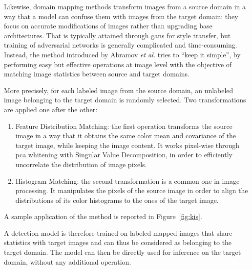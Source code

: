 \documentclass[%
    corpo=12pt,
    twoside,
    stile=classica,   
    tipotesi=magistrale,
    evenboxes,
    english,
	numerazioneromana,
]{toptesi}
\newcommand{\quotes}[1]{``#1''}
\begin{document}
\bigskip
Likewise, domain mapping methods transform images from a source domain in a way that a model can confuse them with images from the target domain: they focus on accurate modifications of images rather than upgrading base architectures. That is typically attained through \glspl{gan} for style transfer, but training of adversarial networks is generally complicated and time-consuming. Instead, the method introduced by Abramov \textit{et al.}\cite{abramov2020simple} tries to \quotes{keep it simple}, by performing easy but effective operations at image level with the objective of matching image statistics between source and target domains.

More precisely, for each labeled image from the source domain, an unlabeled image belonging to the target domain is randomly selected. Two transformations are applied one after the other:
\begin{enumerate}
	\item Feature Distribution Matching: the first operation transforms the source image in a way that it obtains the same color mean and covariance of the target image, while keeping the image content. It works pixel-wise through \gls{pca} whitening with Singular Value Decomposition, in order to efficiently uncorrelate the distribution of image pixels.
	\item Histogram Matching: the second transformation is a common one in image processing. It manipulates the pixels of the source image in order to align the distributions of its color histograms to the ones of the target image.
\end{enumerate}
A sample application of the method is reported in Figure~\ref{fig:kis}.

A detection model is therefore trained on labeled mapped images that share statistics with target images and can thus be considered as belonging to the target domain. The model can then be directly used for inference on the target domain, without any additional operation.
\end{document}
